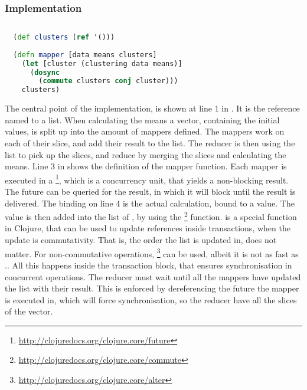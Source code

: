 \subsubsection{Implementation}
\begin{lstlisting}[float,label=lst:stm_implementation,
  caption={\ac{STM} Implementation},
  language=clojure,  
  showspaces=false,
  showtabs=false,
  breaklines=true,
  showstringspaces=false,
  breakatwhitespace=true,
  commentstyle=\color{greencomments},
  keywordstyle=\color{bluekeywords},
  stringstyle=\color{redstrings}]  % Start your code-block
  
  (def clusters (ref '()))
    
  (defn mapper [data means clusters]
    (let [cluster (clustering data means)]
      (dosync
        (commute clusters conj cluster)))
    clusters)
\end{lstlisting}

The central point of the implementation, is shown at line 1 in . It is the reference named  to a list. When calculating the means a vector, containing the initial values, is split up into the amount of mappers defined. The mappers work on each of their slice, and add their result to the list. The reducer is then using the list to pick up the slices, and reduce by merging the slices and calculating the means. Line 3 in shows the definition of the mapper function. Each mapper is executed in a \footnote{\url{http://clojuredocs.org/clojure.core/future}}, which is a concurrency unit, that yields a non-blocking result. The future can be queried for the result, in which it will block until the result is delivered. The  binding on line 4 is the actual calculation, bound to a value. The  value is then added into the list of , by using the \footnote{\url{http://clojuredocs.org/clojure.core/commute}} function.  is a special function in Clojure, that can be used to update references inside transactions, when the update is commutativity. That is, the order the list is updated in, does not matter. For non-commutative operations, \footnote{\url{http://clojuredocs.org/clojure.core/alter}} can be used, albeit it is not as fast as .. All this happens inside the  transaction block, that ensures synchronisation in concurrent operations. The reducer must wait until all the mappers have updated the list with their result. This is enforced by dereferencing the future the mapper is executed in, which will force synchronisation, so the reducer have all the slices of the vector.

